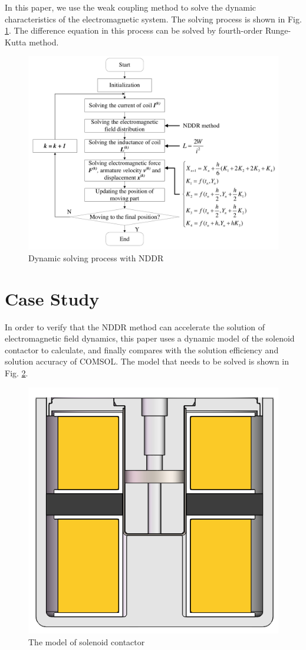 \documentclass[journal,transmag]{IEEEtran}
\begin{document}
In this paper, we use the weak coupling method to solve the dynamic characteristics of the electromagnetic system. The solving process is shown in Fig. \ref{fig:flowchart}. The difference equation in this process can be solved by fourth-order Runge-Kutta method.
\begin{figure}
	\centering
	\includegraphics[width=1.0\linewidth]{flowchart.pdf}
	\caption{Dynamic solving process with NDDR}
	\label{fig:flowchart}
\end{figure}

\section{Case Study}
In order to verify that the NDDR method can accelerate the solution of electromagnetic field dynamics, this paper uses a dynamic model of the solenoid contactor to calculate, and finally compares with the solution efficiency and solution accuracy of COMSOL. The model that needs to be solved is shown in Fig. \ref{fig:simple2}.
\begin{figure}
	\centering
	\includegraphics[width=0.4\linewidth]{simple2}
	\caption{The model of solenoid contactor}
	\label{fig:simple2}
\end{figure}
\end{document}
